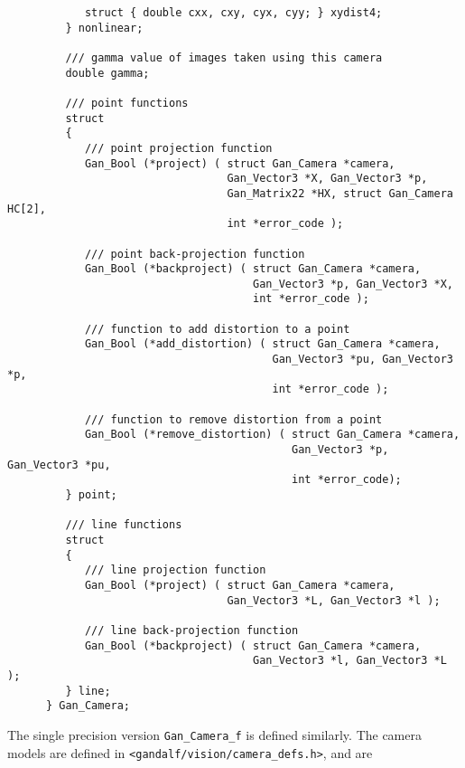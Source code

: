 \begin{verbatim}
            struct { double cxx, cxy, cyx, cyy; } xydist4;
         } nonlinear;

         /// gamma value of images taken using this camera
         double gamma;

         /// point functions
         struct
         {
            /// point projection function
            Gan_Bool (*project) ( struct Gan_Camera *camera,
                                  Gan_Vector3 *X, Gan_Vector3 *p,
                                  Gan_Matrix22 *HX, struct Gan_Camera HC[2],
                                  int *error_code );

            /// point back-projection function
            Gan_Bool (*backproject) ( struct Gan_Camera *camera,
                                      Gan_Vector3 *p, Gan_Vector3 *X,
                                      int *error_code );

            /// function to add distortion to a point
            Gan_Bool (*add_distortion) ( struct Gan_Camera *camera,
                                         Gan_Vector3 *pu, Gan_Vector3 *p,
                                         int *error_code );

            /// function to remove distortion from a point
            Gan_Bool (*remove_distortion) ( struct Gan_Camera *camera,
                                            Gan_Vector3 *p, Gan_Vector3 *pu,
                                            int *error_code);
         } point;

         /// line functions
         struct
         {
            /// line projection function
            Gan_Bool (*project) ( struct Gan_Camera *camera,
                                  Gan_Vector3 *L, Gan_Vector3 *l );

            /// line back-projection function
            Gan_Bool (*backproject) ( struct Gan_Camera *camera,
                                      Gan_Vector3 *l, Gan_Vector3 *L );
         } line;
      } Gan_Camera;
\end{verbatim}
The single precision version {\tt Gan\_Camera\_f} is defined similarly.
The camera models are defined in {\tt <gandalf/vision/camera\_defs.h>},
and are
